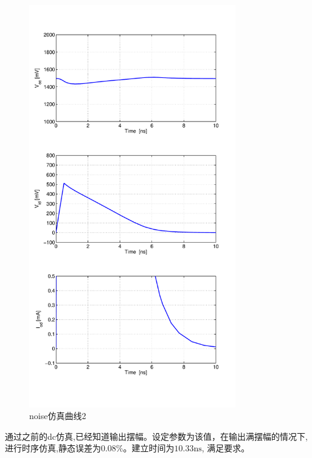 \documentclass[a4paper]{article}
\newcommand{\uns}{\si{\nano\second}}
\begin{document}
\begin{figure}[htb]
    \begin{center}
        \includegraphics[width=0.8\textwidth]{common/tran2.pdf}
    \end{center}
    \caption{noise仿真曲线2}
    \label{commontran2}
\end{figure}
通过之前的dc仿真,已经知道输出摆幅。设定参数为该值，在输出满摆幅的情况下,进行时序仿真,静态误差为$0.08\%$。建立时间为$10.33\uns$,
满足要求。
\newpage
\clearpage
\end{document}
